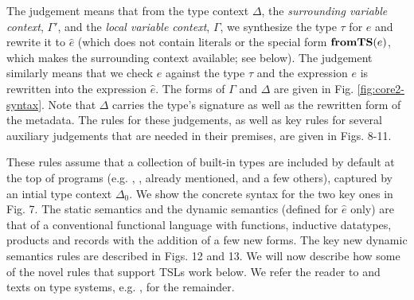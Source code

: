 The judgement 
means that from the type context $\Delta$, the \emph{surrounding variable context}, $\Gamma'$, and the \emph{local variable context}, $\Gamma$, we synthesize the type $\tau$ for $e$ and rewrite it to  $\hat{e}$ (which does not contain literals or the special form $\textbf{fromTS}(e)$, which makes the surrounding context available; see below).
The judgement 
 similarly 
means that we check $e$ against the type $\tau$ and the expression $e$ is rewritten into the expression $\hat{e}$. The forms of $\Gamma$ and $\Delta$ are given in Fig. \ref{fig:core2-syntax}. Note that $\Delta$ carries the type's signature as well as the rewritten form of the metadata. The rules for these judgements, as well as key rules for several auxiliary judgements that are needed in their premises, are given in Figs. 8-11. 

These rules assume that a collection of built-in types are included by default at the top of programs (e.g. , ,  already mentioned, and a few others), captured by an intial type context $\Delta_0$. We show the concrete syntax for the two key ones in Fig. 7. The static semantics and the dynamic semantics (defined for $\hat{e}$ only) are that of a conventional functional language with functions, inductive datatypes, products and records  with the addition of a few new forms. The key new dynamic semantics rules are described in Figs. 12 and 13. We will now describe how some of the novel rules that support TSLs work below. We refer the reader to \cite{Lovas08abidirectional} and texts on type systems, e.g. \cite{pfpl,tapl}, for the remainder.

